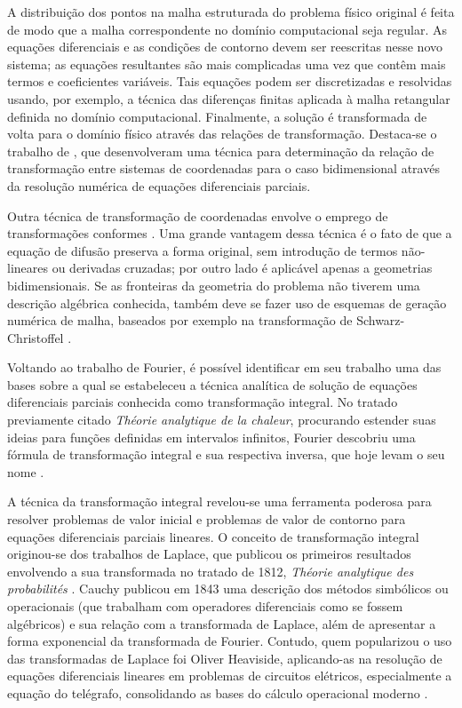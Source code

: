 A distribuição dos pontos na malha estruturada do problema físico original é feita de modo que a malha correspondente no domínio computacional seja regular. 
As equações diferenciais e as condições de contorno devem ser reescritas nesse novo sistema; as equações resultantes são mais complicadas uma vez que contêm mais
termos e coeficientes variáveis. Tais equações podem ser discretizadas e resolvidas usando, por exemplo, a técnica das diferenças finitas aplicada à malha retangular definida no domínio computacional.
Finalmente, a solução é transformada de volta para o domínio físico através das relações de transformação. Destaca-se o trabalho de \citet{artigo_thompson},
que desenvolveram uma técnica para determinação da relação de transformação entre sistemas de coordenadas para o caso bidimensional através da resolução numérica de equações diferenciais parciais.

Outra técnica de transformação de coordenadas envolve o emprego de transformações conformes \citep{livro_numerical_grid}. Uma grande vantagem
dessa técnica é o fato de que a equação de difusão preserva a forma original, sem introdução de termos não-lineares ou derivadas cruzadas;
por outro lado é aplicável apenas a geometrias bidimensionais. Se as fronteiras da geometria do problema não tiverem uma descrição algébrica
conhecida, também deve se fazer uso de esquemas de geração numérica de malha, baseados por exemplo na transformação de Schwarz-Christoffel \citep{livro_brown}.

Voltando ao trabalho de Fourier, é possível identificar em seu trabalho uma das bases sobre a qual se estabeleceu a técnica analítica de solução
de equações diferenciais parciais conhecida como transformação integral. No tratado previamente citado \textit{Théorie analytique de la chaleur},
procurando estender suas ideias para funções definidas em intervalos infinitos, Fourier descobriu uma fórmula de transformação integral e
sua respectiva inversa, que hoje levam o seu nome \citep{livro_integral_transforms}.

A técnica da transformação integral revelou-se uma
ferramenta poderosa para resolver problemas de valor inicial e problemas de valor de contorno para equações diferenciais parciais lineares.
O conceito de transformação integral originou-se dos trabalhos de Laplace, que publicou os primeiros resultados envolvendo a sua transformada
no tratado de 1812, \textit{Théorie analytique des probabilités} \citep{livro_integral_transforms}. Cauchy publicou em 1843 uma descrição
dos métodos simbólicos ou operacionais (que trabalham com operadores diferenciais como se fossem algébricos) \citep{livro_cauchy} e sua relação com a transformada de
Laplace, além de apresentar a forma exponencial da transformada de Fourier. Contudo, quem popularizou o uso das transformadas de Laplace foi Oliver Heaviside,
aplicando-as na resolução de equações diferenciais lineares em problemas de circuitos elétricos, especialmente a equação do telégrafo, consolidando as bases do
cálculo operacional moderno \citep{livro_yavetz, artigo_carson}. 

